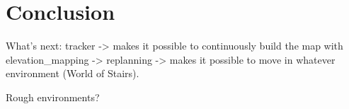 \chapter{Conclusion}
What's next: tracker -> makes it possible to continuously build the map with 
elevation\_mapping -> replanning -> makes it possible to move in whatever 
environment (World of Stairs).

Rough environments?

